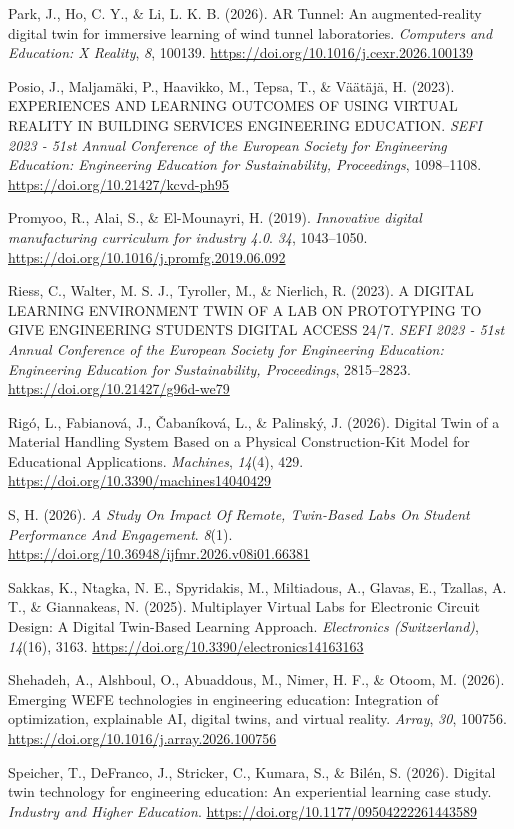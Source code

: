 Park, J., Ho, C. Y., \& Li, L. K. B. (2026). AR Tunnel: An
augmented-reality digital twin for immersive learning of wind tunnel
laboratories. \emph{Computers and Education: X Reality}, \emph{8}, 100139.
\url{https://doi.org/10.1016/j.cexr.2026.100139}

Posio, J., Maljamäki, P., Haavikko, M., Tepsa, T., \& Väätäjä, H. (2023).
EXPERIENCES AND LEARNING OUTCOMES OF USING VIRTUAL REALITY IN BUILDING
SERVICES ENGINEERING EDUCATION. \emph{SEFI 2023 - 51st Annual Conference of
the European Society for Engineering Education: Engineering Education
for Sustainability, Proceedings}, 1098--1108.
\url{https://doi.org/10.21427/kcvd-ph95}

Promyoo, R., Alai, S., \& El-Mounayri, H. (2019). \emph{Innovative digital
manufacturing curriculum for industry 4.0}. \emph{34}, 1043--1050.
\url{https://doi.org/10.1016/j.promfg.2019.06.092}

Riess, C., Walter, M. S. J., Tyroller, M., \& Nierlich, R. (2023). A
DIGITAL LEARNING ENVIRONMENT TWIN OF A LAB ON PROTOTYPING TO GIVE
ENGINEERING STUDENTS DIGITAL ACCESS 24/7. \emph{SEFI 2023 - 51st Annual
Conference of the European Society for Engineering Education:
Engineering Education for Sustainability, Proceedings}, 2815--2823.
\url{https://doi.org/10.21427/g96d-we79}

Rigó, L., Fabianová, J., Čabaníková, L., \& Palinský, J. (2026). Digital
Twin of a Material Handling System Based on a Physical Construction-Kit
Model for Educational Applications. \emph{Machines}, \emph{14}(4), 429.
\url{https://doi.org/10.3390/machines14040429}

S, H. (2026). \emph{A Study On Impact Of Remote, Twin-Based Labs On Student
Performance And Engagement}. \emph{8}(1).
\url{https://doi.org/10.36948/ijfmr.2026.v08i01.66381}

Sakkas, K., Ntagka, N. E., Spyridakis, M., Miltiadous, A., Glavas, E.,
Tzallas, A. T., \& Giannakeas, N. (2025). Multiplayer Virtual Labs for
Electronic Circuit Design: A Digital Twin-Based Learning Approach.
\emph{Electronics (Switzerland)}, \emph{14}(16), 3163.
\url{https://doi.org/10.3390/electronics14163163}

Shehadeh, A., Alshboul, O., Abuaddous, M., Nimer, H. F., \& Otoom, M.
(2026). Emerging WEFE technologies in engineering education: Integration
of optimization, explainable AI, digital twins, and virtual reality.
\emph{Array}, \emph{30}, 100756. \url{https://doi.org/10.1016/j.array.2026.100756}

Speicher, T., DeFranco, J., Stricker, C., Kumara, S., \& Bilén, S.
(2026). Digital twin technology for engineering education: An
experiential learning case study. \emph{Industry and Higher Education}.
\url{https://doi.org/10.1177/09504222261443589}

